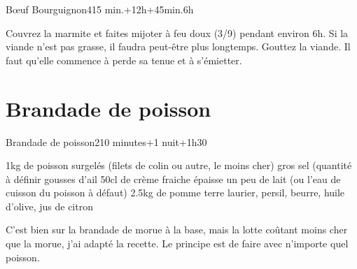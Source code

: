 {\begin{recette}{Bœuf Bourguignon}{4}{15 min.+12h+45min.}{6h}
\begin{cuisson}
Couvrez la marmite et faites mijoter à feu doux (3/9) pendant environ 6h. Si la viande n'est pas grasse, il faudra peut-être plus longtemps. Gouttez la viande. Il faut qu'elle commence à perde sa tenue et à s'émietter.
\end{cuisson}
\end{recette}

\section{Brandade de poisson}
\begin{recette}{Brandade de poisson}{2}{10 minutes+1 nuit+1h30}{}
\begin{ingredients}
\ingredient 1kg de poisson surgelés (filets de colin ou autre, le moins cher)
\ingredient gros sel (quantité à définir
 gousses d'ail
\ingredient 50cl de crème fraiche épaisse
\ingredient un peu de lait (ou l'eau de cuisson du poisson à défaut)
\ingredient 2.5kg de pomme terre
\ingredient laurier, persil, beurre, huile d'olive, jus de citron
\end{ingredients}

\begin{remarque}
C'est bien sur la brandade de morue à la base, mais la lotte coûtant moins cher que la morue, j'ai adapté la recette. Le 
principe est de faire avec n'importe quel poisson.
\end{remarque}



\end{recette}}
